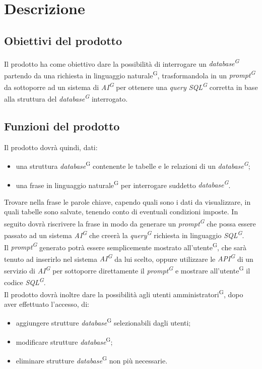 \section{Descrizione}
\subsection{Obiettivi del prodotto}
Il prodotto ha come obiettivo dare la possibilità di interrogare un \textit{database\textsuperscript{G}} partendo da una richiesta in linguaggio naturale\textsuperscript{G}, trasformandola in un \textit{prompt\textsuperscript{G}} da sottoporre ad un sistema di \textit{AI\textsuperscript{G}} per ottenere una \textit{query SQL\textsuperscript{G}} corretta in base alla struttura del \textit{database\textsuperscript{G}} interrogato.

\subsection{Funzioni del prodotto}
Il prodotto dovrà quindi, dati:
\begin{itemize}
	\item una struttura \textit{database}\textsuperscript{G} contenente le tabelle e le relazioni di un \textit{database\textsuperscript{G}};
	\item una frase in linguaggio naturale\textsuperscript{G} per interrogare suddetto \textit{database\textsuperscript{G}}.
\end{itemize}
Trovare nella frase le parole chiave, capendo quali sono i dati da visualizzare, in quali tabelle sono salvate, tenendo conto di eventuali condizioni imposte.
In seguito dovrà riscrivere la frase in modo da generare un \textit{prompt\textsuperscript{G}} che possa essere passato ad un sistema \textit{AI\textsuperscript{G}} che creerà la \textit{query\textsuperscript{G}} richiesta in linguaggio \textit{SQL\textsuperscript{G}}. \\
Il \textit{prompt\textsuperscript{G}} generato potrà essere semplicemente mostrato all’utente\textsuperscript{G}, che sarà tenuto ad inserirlo nel sistema \textit{AI\textsuperscript{G}} da lui scelto, oppure utilizzare le \textit{API\textsuperscript{G}} di un servizio di \textit{AI\textsuperscript{G}} per sottoporre direttamente il \textit{prompt\textsuperscript{G}} e mostrare all’utente\textsuperscript{G} il codice \textit{SQL\textsuperscript{G}}. \\ 
Il prodotto dovrà inoltre dare la possibilità agli utenti amministratori\textsuperscript{G}, dopo aver effettuato l’accesso, di:
\begin{itemize}
	\item aggiungere strutture \textit{database}\textsuperscript{G} selezionabili dagli utenti;
	\item modificare strutture \textit{database}\textsuperscript{G};
	\item eliminare  strutture \textit{database}\textsuperscript{G} non più necessarie.
\end{itemize}